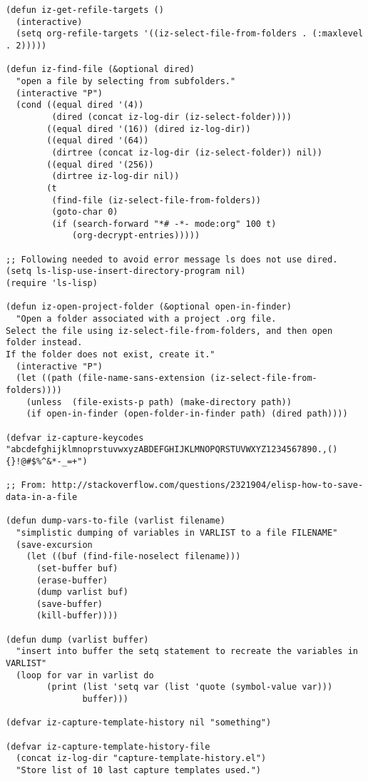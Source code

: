 \documentclass[nofonts]{tufte-handout}
\begin{document}
\begin{verbatim}
(defun iz-get-refile-targets ()
  (interactive)
  (setq org-refile-targets '((iz-select-file-from-folders . (:maxlevel . 2)))))

(defun iz-find-file (&optional dired)
  "open a file by selecting from subfolders."
  (interactive "P")
  (cond ((equal dired '(4))
         (dired (concat iz-log-dir (iz-select-folder))))
        ((equal dired '(16)) (dired iz-log-dir))
        ((equal dired '(64))
         (dirtree (concat iz-log-dir (iz-select-folder)) nil))
        ((equal dired '(256))
         (dirtree iz-log-dir nil))
        (t
         (find-file (iz-select-file-from-folders))
         (goto-char 0)
         (if (search-forward "*# -*- mode:org" 100 t)
             (org-decrypt-entries)))))

;; Following needed to avoid error message ls does not use dired.
(setq ls-lisp-use-insert-directory-program nil)
(require 'ls-lisp)

(defun iz-open-project-folder (&optional open-in-finder)
  "Open a folder associated with a project .org file.
Select the file using iz-select-file-from-folders, and then open folder instead.
If the folder does not exist, create it."
  (interactive "P")
  (let ((path (file-name-sans-extension (iz-select-file-from-folders))))
    (unless  (file-exists-p path) (make-directory path))
    (if open-in-finder (open-folder-in-finder path) (dired path))))

(defvar iz-capture-keycodes "abcdefghijklmnoprstuvwxyzABDEFGHIJKLMNOPQRSTUVWXYZ1234567890.,(){}!@#$%^&*-_=+")

;; From: http://stackoverflow.com/questions/2321904/elisp-how-to-save-data-in-a-file

(defun dump-vars-to-file (varlist filename)
  "simplistic dumping of variables in VARLIST to a file FILENAME"
  (save-excursion
    (let ((buf (find-file-noselect filename)))
      (set-buffer buf)
      (erase-buffer)
      (dump varlist buf)
      (save-buffer)
      (kill-buffer))))

(defun dump (varlist buffer)
  "insert into buffer the setq statement to recreate the variables in VARLIST"
  (loop for var in varlist do
        (print (list 'setq var (list 'quote (symbol-value var)))
               buffer)))

(defvar iz-capture-template-history nil "something")

(defvar iz-capture-template-history-file
  (concat iz-log-dir "capture-template-history.el")
  "Store list of 10 last capture templates used.")


\end{verbatim}
\end{document}
